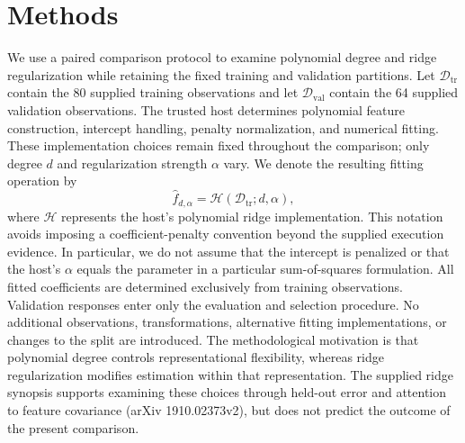 \documentclass[11pt]{article}
\begin{document}
\section{Methods}
We use a paired comparison protocol to examine polynomial degree and ridge regularization while retaining the fixed training and validation partitions. Let \(\mathcal{D}_{\mathrm{tr}}\) contain the 80 supplied training observations and let \(\mathcal{D}_{\mathrm{val}}\) contain the 64 supplied validation observations. The trusted host determines polynomial feature construction, intercept handling, penalty normalization, and numerical fitting. These implementation choices remain fixed throughout the comparison; only degree \(d\) and regularization strength \(\alpha\) vary. We denote the resulting fitting operation by
\[
\widehat f_{d,\alpha}
=
\mathcal{H}\!\left(\mathcal{D}_{\mathrm{tr}};d,\alpha\right),
\]
where \(\mathcal{H}\) represents the host's polynomial ridge implementation. This notation avoids imposing a coefficient-penalty convention beyond the supplied execution evidence. In particular, we do not assume that the intercept is penalized or that the host's \(\alpha\) equals the parameter in a particular sum-of-squares formulation. All fitted coefficients are determined exclusively from training observations. Validation responses enter only the evaluation and selection procedure. No additional observations, transformations, alternative fitting implementations, or changes to the split are introduced. The methodological motivation is that polynomial degree controls representational flexibility, whereas ridge regularization modifies estimation within that representation. The supplied ridge synopsis supports examining these choices through held-out error and attention to feature covariance (arXiv 1910.02373v2), but does not predict the outcome of the present comparison.
\end{document}
